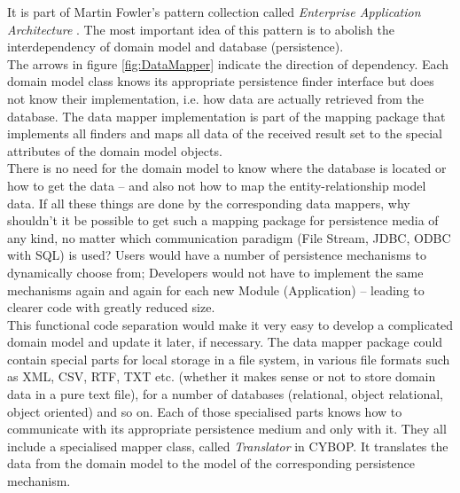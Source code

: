 It is part of Martin Fowler's pattern collection called \emph{Enterprise Application Architecture}
\cite{enterprisepattern}. The most important idea of this pattern is
to abolish the interdependency of domain model and database (persistence).\\
The arrows in figure \ref{fig:DataMapper} indicate the direction of dependency.
Each domain model class knows its appropriate persistence finder interface but
does not know their implementation, i.e. how data are actually retrieved from
the database. The data mapper implementation is part of the mapping package
that implements all finders and maps all data of the received result set to the
special attributes of the domain model objects.\\
There is no need for the domain model to know where the database is located or how
to get the data -- and also not how to map the entity-relationship model data.
If all these things are done by the corresponding data mappers, why shouldn't
it be possible to get such a mapping package for persistence media of any kind,
no matter which communication paradigm (File Stream, JDBC, ODBC with SQL) is used?
Users would have a number of persistence mechanisms to dynamically choose from;
Developers would not have to implement the same mechanisms again and again for
each new Module (Application) -- leading to clearer code with greatly reduced size.\\
This functional code separation would make it very easy to develop a complicated
domain model and update it later, if necessary. The data mapper package could
contain special parts for local storage in a file system, in various file formats
such as XML, CSV, RTF, TXT etc. (whether it makes sense or not to store domain data
in a pure text file), for a number of databases (relational, object relational,
object oriented) and so on.
Each of those specialised parts knows how to communicate with its appropriate
persistence medium and only with it. They all include a specialised mapper class,
called \emph{Translator} in CYBOP. It translates the data from the domain model
to the model of the corresponding persistence mechanism.\\
